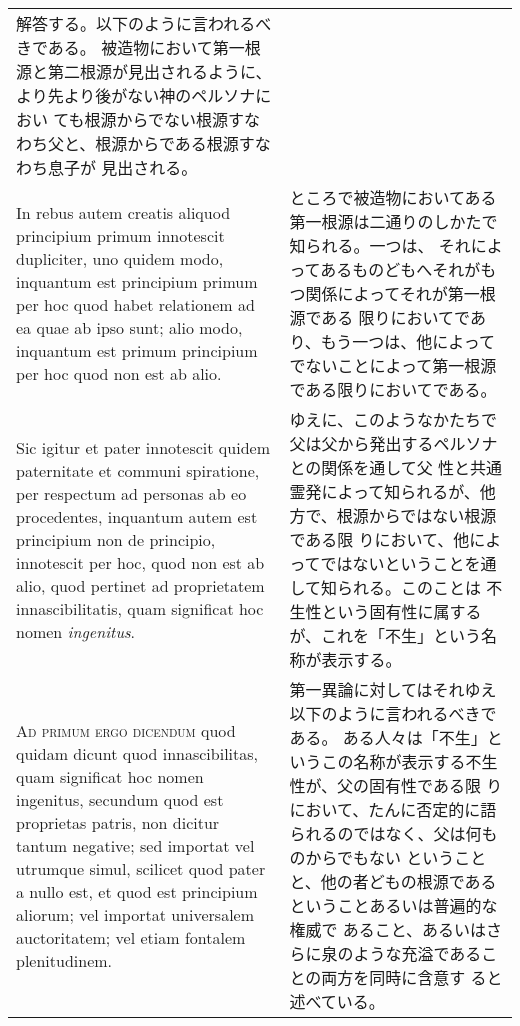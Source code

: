 \documentclass[10pt]{jsarticle} %
\begin{document}
\begin{longtable}{p{21em}p{21em}}
解答する。以下のように言われるべきである。
被造物において第一根源と第二根源が見出されるように、より先より後がない神のペルソナにおい
 ても根源からでない根源すなわち父と、根源からである根源すなわち息子が
 見出される。

\\

In rebus autem
creatis aliquod principium primum innotescit dupliciter, uno quidem
modo, inquantum est principium primum per hoc quod habet relationem ad
ea quae ab ipso sunt; alio modo, inquantum est primum principium per
hoc quod non est ab alio. 

&

ところで被造物においてある第一根源は二通りのしかたで知られる。一つは、
 それによってあるものどもへそれがもつ関係によってそれが第一根源である
 限りにおいてであり、もう一つは、他によってでないことによって第一根源
 である限りにおいてである。

\\


Sic igitur et pater innotescit quidem
paternitate et communi spiratione, per respectum ad personas ab eo
procedentes, inquantum autem est principium non de principio,
innotescit per hoc, quod non est ab alio, quod pertinet ad
proprietatem innascibilitatis, quam significat hoc nomen {\itshape ingenitus}.


&

ゆえに、このようなかたちで父は父から発出するペルソナとの関係を通して父
 性と共通霊発によって知られるが、他方で、根源からではない根源である限
 りにおいて、他によってではないということを通して知られる。このことは
 不生性という固有性に属するが、これを「不生」という名称が表示する。

\\



{\scshape Ad primum ergo dicendum} quod quidam dicunt quod innascibilitas, quam
significat hoc nomen ingenitus, secundum quod est proprietas patris,
non dicitur tantum negative; sed importat vel utrumque simul, scilicet
quod pater a nullo est, et quod est principium aliorum; vel importat
universalem auctoritatem; vel etiam fontalem plenitudinem. 

&

第一異論に対してはそれゆえ以下のように言われるべきである。
ある人々は「不生」というこの名称が表示する不生性が、父の固有性である限
 りにおいて、たんに否定的に語られるのではなく、父は何ものからでもない
 ということと、他の者どもの根源であるということあるいは普遍的な権威で
 あること、あるいはさらに泉のような充溢であることの両方を同時に含意す
 ると述べている。


\end{longtable}
\end{document}
